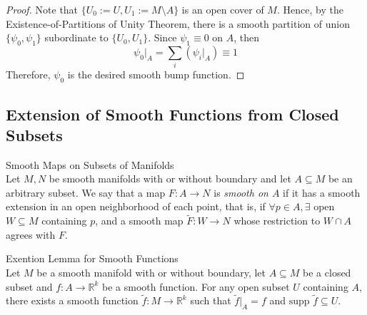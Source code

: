 \begin{proof}
    Note that $\{U_0:= U, U_1:=M\setminus A\}$ is an open cover of $M$. Hence, by the Existence-of-Partitions of Unity Theorem, there is a smooth partition of union $\{\psi_0, \psi_1\}$ subordinate to $\{U_0,U_1\}$. Since $\psi_1 \equiv0$ on $A$, then
    \[
    \psi_0|_A =\sum_i (\psi_i|_A)\equiv 1
    \]
    Therefore, $\psi_0$ is the desired smooth bump function.
\end{proof}

\subsection{Extension of Smooth Functions from Closed Subsets}

\begin{definition}{Smooth Maps on Subsets of Manifolds}\\
Let $M,N$ be smooth manifolds with or without boundary and let $A\subseteq M$ be an arbitrary subset. We say that a map $F:A\to N$ is \textit{smooth on $A$} if it has a smooth extension in an open neighborhood of each point, that is, if $\forall p\in A, \exists$ open $W\subseteq M$ containing $p$, and a smooth map $\widetilde{F}:W\to N$ whose restriction to $W\cap A$ agrees with $F$.
\end{definition}

\begin{lemma}{Exention Lemma for Smooth Functions}\\
Let $M$ be a smooth manifold with or without boundary, let $A\subseteq M$ be a closed subset and $f:A\to \mathbb{R}^k$ be a smooth function. For any open subset $U$ containing $A$, there exists a smooth function $\widetilde{f}:M\to \mathbb{R}^k$ such that $\widetilde{f}|_A=f$ and $\text{supp }\widetilde{f} \subseteq U$.
\end{lemma}

